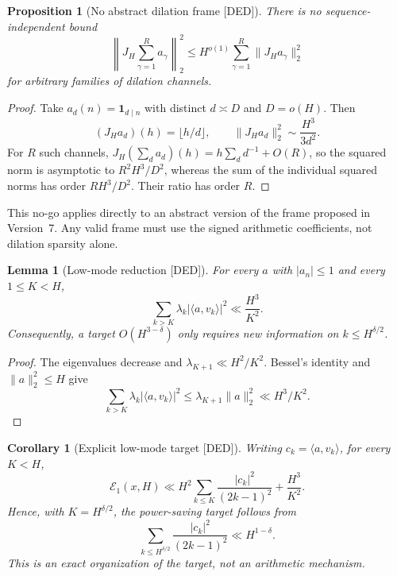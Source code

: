 \documentclass[11pt]{amsart}
\numberwithin{equation}{section}
\theoremstyle{plain}
\newtheorem{proposition}[theorem]{Proposition}
\newtheorem{lemma}[theorem]{Lemma}
\newtheorem{corollary}[theorem]{Corollary}
\theoremstyle{definition}
\theoremstyle{remark}
\begin{document}
\begin{proposition}[No abstract dilation frame \textnormal{[DED]}]
\label{prop:no_abstract_dilation_frame}
There is no sequence-independent bound
\begin{equation}
 \left\|J_H\sum_{\gamma=1}^{R}a_\gamma\right\|_2^2
 \leq H^{o(1)}\sum_{\gamma=1}^{R}\|J_Ha_\gamma\|_2^2
\label{eq:false_abstract_dilation_frame}
\end{equation}
for arbitrary families of dilation channels.
\end{proposition}

\begin{proof}
Take $a_d(n)=\mathbf1_{d\mid n}$ with distinct $d\asymp D$ and
$D=o(H)$.  Then
\begin{equation}
 (J_Ha_d)(h)=\lfloor h/d\rfloor,\qquad
 \|J_Ha_d\|_2^2\sim\frac{H^3}{3d^2}.
\end{equation}
For $R$ such channels,
$J_H(\sum_da_d)(h)=h\sum_dd^{-1}+O(R)$, so the squared norm is
asymptotic to $R^2H^3/D^2$, whereas the sum of the individual squared norms
has order $RH^3/D^2$.  Their ratio has order $R$.
\end{proof}

This no-go applies directly to an abstract version of the frame proposed in
Version~7.  Any valid frame must use the signed arithmetic coefficients, not
dilation sparsity alone.

\begin{lemma}[Low-mode reduction \textnormal{[DED]}]
\label{lem:low_mode_reduction}
For every $a$ with $|a_n|\leq1$ and every $1\leq K<H$,
\begin{equation}
 \sum_{k>K}\lambda_k|\langle a,v_k\rangle|^2
 \ll\frac{H^3}{K^2}.
\label{eq:high_mode_tail}
\end{equation}
Consequently, a target $O(H^{3-\delta})$ only requires new information on
$k\leq H^{\delta/2}$.
\end{lemma}

\begin{proof}
The eigenvalues decrease and
$\lambda_{K+1}\ll H^2/K^2$.  Bessel's identity and
$\|a\|_2^2\leq H$ give
\begin{equation}
 \sum_{k>K}\lambda_k|\langle a,v_k\rangle|^2
 \leq\lambda_{K+1}\|a\|_2^2
 \ll H^3/K^2.
\end{equation}
\end{proof}

\begin{corollary}[Explicit low-mode target \textnormal{[DED]}]
\label{cor:explicit_low_mode_target}
Writing $c_k=\langle a,v_k\rangle$, for every $K<H$,
\begin{equation}
 \mathcal E_1(x,H)
 \ll H^2\sum_{k\leq K}\frac{|c_k|^2}{(2k-1)^2}
 +\frac{H^3}{K^2}.
\label{eq:explicit_low_mode_split}
\end{equation}
Hence, with $K=H^{\delta/2}$, the power-saving target follows from
\begin{equation}
 \sum_{k\leq H^{\delta/2}}
 \frac{|c_k|^2}{(2k-1)^2}
 \ll H^{1-\delta}.
\label{eq:explicit_low_mode_budget}
\end{equation}
This is an exact organization of the target, not an arithmetic mechanism.
\end{corollary}
\end{document}
